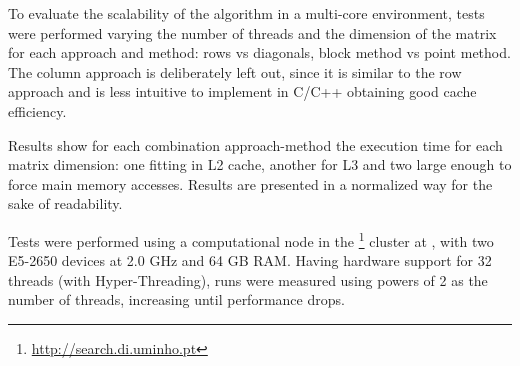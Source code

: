 
To evaluate the scalability of the algorithm in a multi-core environment, tests were performed varying the number of threads and the dimension of the matrix for each approach and method: rows vs diagonals, block method vs point method. The column approach is deliberately left out, since it is similar to the row approach and is less intuitive to implement in C/C++ obtaining good cache efficiency.

Results show for each combination approach-method the execution time for each matrix dimension: one fitting in L2 cache, another for L3 and two large enough to force main memory accesses.
Results are presented in a normalized way for the sake of readability.

Tests were performed using a computational node in the \search\footnote{\url{http://search.di.uminho.pt}} cluster at \uminho, with two \intel\xeon E5-2650 devices at 2.0 GHz and 64 GB RAM. Having hardware support for 32 threads (with Hyper-Threading), runs were measured using powers of 2 as the number of threads, increasing until performance drops.
